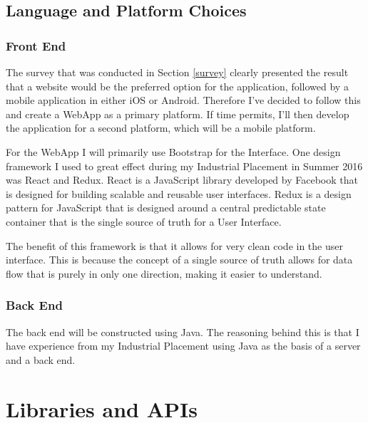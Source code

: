 \documentclass[12pt]{article}
\begin{document}
\subsection{Language and Platform Choices}

\subsubsection{Front End}

The survey that was conducted in Section \ref{survey} clearly presented the result that a website would be the preferred option for the application, followed by a mobile application in either iOS or Android. Therefore I've decided to follow this and create a WebApp as a primary platform. If time permits, I'll then develop the application for a second platform, which will be a mobile platform.

For the WebApp I will primarily use Bootstrap for the Interface. One design framework I used to great effect during my Industrial Placement in Summer 2016 was React and Redux. React is a JavaScript library developed by Facebook that is designed for building scalable and reusable user interfaces. Redux is a design pattern for JavaScript that is designed around a central predictable state container that is the single source of truth for a User Interface. 

The benefit of this framework is that it allows for very clean code in the user interface. This is because the concept of a single source of truth allows for data flow that is purely in only one direction, making it easier to understand.

\subsubsection{Back End}

\label{languagechoice}

The back end will be constructed using Java. The reasoning behind this is that I have experience from my Industrial Placement using Java as the basis of a server and a back end.


\newpage

\section{Libraries and APIs}
\end{document}
